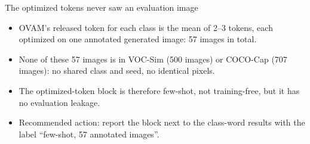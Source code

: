 
\begin{frame}{The optimized tokens never saw an evaluation image}
\begin{itemize}
\item OVAM's released token for each class is the mean of 2--3 tokens, each optimized on one annotated generated image: 57 images in total.
\item None of these 57 images is in VOC-Sim (500 images) or COCO-Cap (707 images): no shared class and seed, no identical pixels.
\item The optimized-token block is therefore few-shot, not training-free, but it has no evaluation leakage.
\item Recommended action: report the block next to the class-word results with the label ``few-shot, 57 annotated images''.
\end{itemize}
\end{frame}
